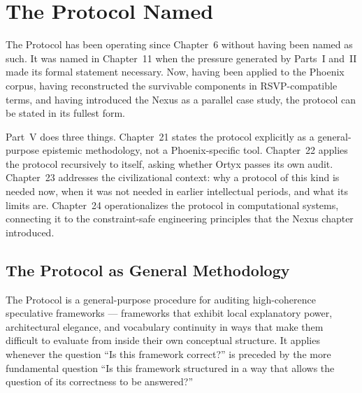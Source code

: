 
\chapter{The Protocol Named}
\label{ch:protocol-named}


\noindent
The \Ortyx{} Protocol has been operating since Chapter~6
without having been named as such. It was named in Chapter~11
when the pressure generated by Parts~I and~II made its
formal statement necessary. Now, having been applied to
the Phoenix corpus, having reconstructed the survivable
components in RSVP-compatible terms, and having introduced
the Nexus as a parallel case study, the protocol can be
stated in its fullest form.

Part~V does three things. Chapter~21 states the protocol
explicitly as a general-purpose epistemic methodology,
not a Phoenix-specific tool. Chapter~22 applies the
protocol recursively to itself, asking whether Ortyx
passes its own audit. Chapter~23 addresses the
civilizational context: why a protocol of this kind
is needed now, when it was not needed in earlier
intellectual periods, and what its limits are. Chapter~24
operationalizes the protocol in computational systems,
connecting it to the constraint-safe engineering
principles that the Nexus chapter introduced.

\section{The Protocol as General Methodology}
\label{sec:protocol-general}

The \Ortyx{} Protocol is a general-purpose procedure
for auditing high-coherence speculative frameworks ---
frameworks that exhibit local explanatory power,
architectural elegance, and vocabulary continuity in
ways that make them difficult to evaluate from inside
their own conceptual structure. It applies whenever
the question ``Is this framework correct?'' is preceded
by the more fundamental question ``Is this framework
structured in a way that allows the question of its
correctness to be answered?''

